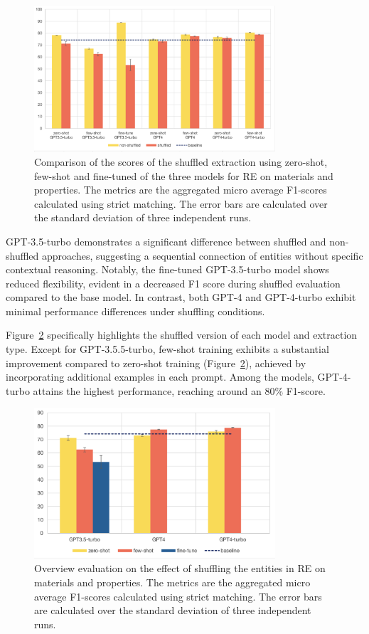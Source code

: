 \documentclass[a4paper]{article}
\begin{document}
\begin{figure}[htbp]
  \centering
  \includegraphics[width=0.8\textwidth]{figures/re-eval-all.png} 
  \caption{Comparison of the scores of the shuffled extraction using zero-shot, few-shot and fine-tuned of the three models for RE on materials and properties. The metrics are the aggregated micro average F1-scores calculated using strict matching. The error bars are calculated over the standard deviation of three independent runs.}
  \label{fig:re-eval-all}
\end{figure}

GPT-3.5-turbo demonstrates a significant difference between shuffled and non-shuffled approaches, suggesting a sequential connection of entities without specific contextual reasoning. 
Notably, the fine-tuned GPT-3.5-turbo model shows reduced flexibility, evident in a decreased F1 score during shuffled evaluation compared to the base model. 
In contrast, both GPT-4 and GPT-4-turbo exhibit minimal performance differences under shuffling conditions.

Figure~\ref{fig:re-eval-shuffled-all} specifically highlights the shuffled version of each model and extraction type. Except for GPT-3.5.5-turbo, few-shot training exhibits a substantial improvement compared to zero-shot training (Figure~\ref{fig:re-eval-shuffled-all}), achieved by incorporating additional examples in each prompt. 
Among the models, GPT-4-turbo attains the highest performance, reaching around an 80\% F1-score.

\begin{figure}[htbp]
  \centering
  \includegraphics[width=0.8\textwidth]{figures/re-eval-shuffled-all.png} 
  \caption{Overview evaluation on the effect of shuffling the entities in RE on materials and properties. The metrics are the aggregated micro average F1-scores calculated using strict matching. The error bars are calculated over the standard deviation of three independent runs.}
  \label{fig:re-eval-shuffled-all}
\end{figure}
\end{document}
